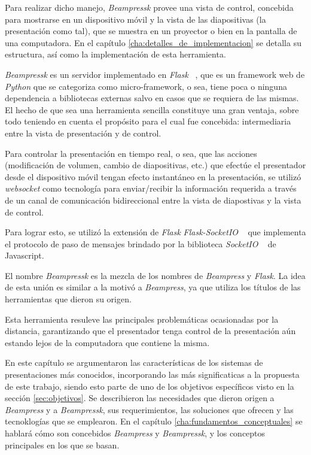 		Para realizar dicho manejo, \textit{Beampressk} provee una vista de control, concebida para mostrarse en un dispositivo móvil y la vista de las diapositivas (la presentación como tal), que se muestra en un proyector o bien en la pantalla de una computadora. En el capítulo \ref{cha:detalles_de_implementacion} se detalla su estructura, así como la implementación de esta herramienta.

		\textit{Beampressk} es un servidor implementado en \textit{Flask} ~\cite{flask}, que es un framework web de \textit{Python} que se categoriza como micro-framework, o sea, tiene poca o ninguna dependencia a bibliotecas externas salvo en casos que se requiera de las mismas. El hecho de que sea una herramienta sencilla constituye una gran ventaja, sobre todo teniendo en cuenta el propósito para el cual fue concebida: intermediaria entre la vista de presentación y de control.

		Para controlar la presentación en tiempo real, o sea, que las acciones (modificación de volumen, cambio de diapositivas, etc.) que efectúe el presentador desde el dispositivo móvil tengan efecto instantáneo en la presentación, se utilizó \textit{websocket} como tecnología para enviar/recibir la información requerida a través de un canal de comunicación bidireccional entre la vista de diapostivas y la vista de control.

		Para lograr esto, se utilizó la extensión de \textit{Flask} \textit{Flask-SocketIO} ~\cite{flasksocket} que implementa el protocolo de paso de mensajes brindado por la biblioteca \textit{SocketIO} ~\cite{socketio} de Javascript.

		El nombre \textit{Beampressk} es la mezcla de los nombres de \textit{Beampress} y \textit{Flask}. La idea de esta unión es similar a la motivó a \textit{Beampress}, ya que utiliza los títulos de las herramientas que dieron su origen.

		Esta herramienta resuleve las principales problemáticas ocasionadas por la distancia, garantizando que el presentador tenga control de la presentación aún estando lejos de la computadora que contiene la misma.

		En este capítulo se argumentaron las características de los sistemas de presentaciones más conocidos, incorporando las más significaticas a la propuesta de este trabajo, siendo esto parte de uno de los objetivos específicos visto en la sección \ref{sec:objetivos}. Se describieron las necesidades que dieron origen a \textit{Beampress} y a \textit{Beampressk}, sus requerimientos, las soluciones que ofrecen y las tecnoklogías que se emplearon. En el capítulo \ref{cha:fundamentos_conceptuales} se hablará cómo son concebidos \textit{Beampress} y \textit{Beampressk}, y los conceptos principales en los que se basan.






